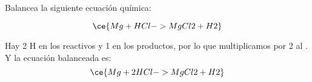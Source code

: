 Balancea la siguiente ecuación química:

\[
    \ce{Mg + HCl -> MgCl2 + H2}
\]

\begin{solutionbox}{2cm}
    Hay 2 H en los reactivos y 1 en los productos, por lo que multiplicamos por 2 al . Y la ecuación balanceada es:
    \[
        \ce{Mg + 2HCl -> MgCl2 + H2}
    \]
\end{solutionbox}